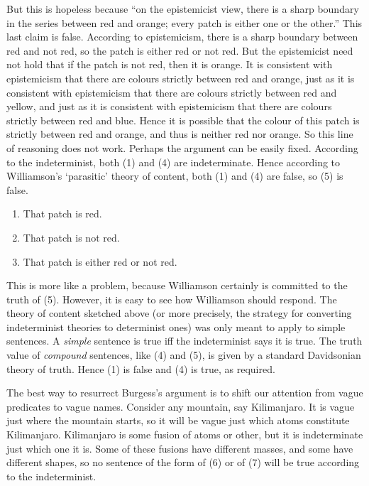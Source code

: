 \noindent But this is hopeless because ``on the epistemicist view, there is a sharp boundary in the series between red and orange; every patch is either one or the other.'' \cite[519]{Burgess2001} This last claim is false. According to epistemicism, there is a sharp boundary between red and not red, so the patch is either red or not red. But the epistemicist need not hold that if the patch is not red, then it is orange. It is consistent with epistemicism that there are colours strictly between red and orange, just as it is consistent with epistemicism that there are colours strictly between red and yellow, and just as it is consistent with epistemicism that there are colours strictly between red and blue. Hence it is possible that the colour of this patch is strictly between red and orange, and thus is neither red nor orange. So this line of reasoning does not work. Perhaps the argument can be easily fixed. According to the indeterminist, both (1) and (4) are indeterminate. Hence according to Williamson's `parasitic' theory of content, both (1) and (4) are false, so (5) is false.

\begin{enumerate}
\renewcommand{\labelenumi}{(\arabic{enumi})}
\item That patch is red.
\setcounter{enumi}{3}
\item That patch is not red.
\item That patch is either red or not red.
\end{enumerate}

\noindent This is more like a problem, because Williamson certainly is committed to the truth of (5). However, it is easy to see how Williamson should respond. The theory of content sketched above (or more precisely, the strategy for converting indeterminist theories to determinist ones) was only meant to apply to simple sentences. A \textit{simple} sentence is true iff the indeterminist says it is true. The truth value of \textit{compound} sentences, like (4) and (5), is given by a standard Davidsonian theory of truth. Hence (1) is false and (4) is true, as required.

The best way to resurrect Burgess's argument is to shift our attention from vague predicates to vague names. Consider any mountain, say Kilimanjaro. It is vague just where the mountain starts, so it will be vague just which atoms constitute Kilimanjaro. Kilimanjaro is some fusion of atoms or other, but it is indeterminate just which one it is. Some of these fusions have different masses, and some have different shapes, so no sentence of the form of (6) or of (7) will be true according to the indeterminist.

